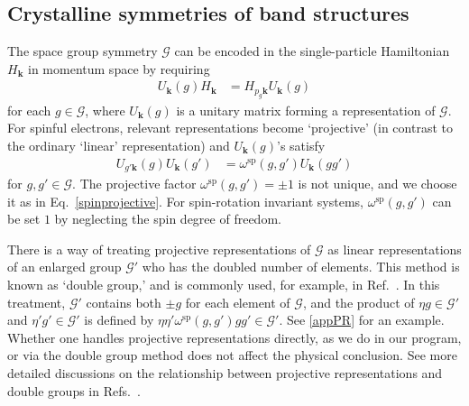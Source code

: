 \documentclass[3p,preprint]{elsarticle}
\newcommand{\calG}{\mathcal{G}}
\newcommand{\vk}{\bm{k}}
\begin{document}
\subsection{Crystalline symmetries of band structures}
\label{subsec:BS}
The space group symmetry $\calG$ can be encoded in the single-particle Hamiltonian $H_{\vk}$ in momentum space by requiring
\begin{align}
\label{eq:symm_cond}
U_{\vk}(g)H_{\vk} &= H_{p_g\vk}U_{\vk}(g)
\end{align}
for each $g\in\calG$, where $U_{\vk}(g)$ is a unitary matrix forming a representation of $\mathcal{G}$. For spinful electrons, relevant representations become `projective' (in contrast to the ordinary `linear' representation) and $U_{\vk}(g)$'s satisfy
\begin{align}
\label{eq:rep_Gk}
U_{g'\vk}(g)U_{\vk}(g') &= \omega^{\text{sp}}(g,g')U_{\vk}(gg')
\end{align}
for $g,g'\in\calG$. 
The projective factor $\omega^{\text{sp}}(g,g')=\pm1$ is not unique, and we choose it as in Eq.~\eqref{spinprojective}.  For spin-rotation invariant systems, $\omega^{\text{sp}}(g,g')$ can be set $1$ by neglecting the spin degree of freedom.  

There is a way of treating projective representations of $\calG$ as linear representations of an enlarged group $\calG'$ who has the doubled number of elements. 
This method is known as `double group,' and is commonly used, for example, in Ref.~\cite{Bilbao}.  In this treatment, $\calG'$ contains both $\pm g$ for each element of $\calG$, and the product of $\eta g\in\calG'$  and $\eta' g'\in\calG'$ is defined by $\eta \eta'\omega^{\text{sp}}(g,g')gg'\in\calG'$. See \ref{appPR} for an example.
 Whether one handles projective representations directly, as we do in our program,  or via the double group method does not affect the physical conclusion.  See more detailed discussions on the relationship between projective representations and double groups in Refs.~\cite{PhysRevLett.117.096404,Watanabe201514665}.
\end{document}
